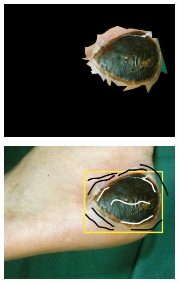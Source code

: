 \begin{figure}[H]
\begin{subfigure}{0.3\textwidth}
		\includegraphics[width=\textwidth]{gambar/res_1.png}
		\caption{}
	  \end{subfigure}
      \begin{subfigure}{0.3\textwidth}
		\centering{}
		\includegraphics[width=\textwidth]{gambar/brush.png}
		\caption{}
	  \end{subfigure}
      \begin{subfigure}{0.3\textwidth}
		\centering{}

\end{subfigure}
\end{figure}
